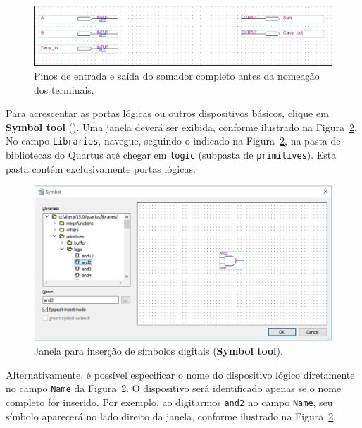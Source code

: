 \documentclass[12pt,a4paper]{article}
\begin{document}
\begin{figure}[htbp!]
    \centering
    \includegraphics[width=\textwidth]{./figs/pin_names_named.png}
    \caption{Pinos de entrada e saída do somador completo antes da nomeação dos terminais.}
    \label{fig:pin_names_named}
\end{figure}

Para acrescentar as portas lógicas ou outros dispositivos básicos, clique em \textbf{Symbol tool} (). Uma janela deverá ser exibida, conforme ilustrado na Figura~\ref{fig:symbol}. No campo \texttt{Libraries}, navegue, seguindo o indicado na Figura~\ref{fig:symbol}, na pasta de bibliotecas do Quartus até chegar em \texttt{logic} (subpasta de \texttt{primitives}). Esta pasta contém exclusivamente portas lógicas. 

\begin{figure}[htbp!]
    \centering
    \includegraphics[width=\textwidth]{./figs/symbol.png}
    \caption{Janela para inserção de símbolos digitais (\textbf{Symbol tool}).}
    \label{fig:symbol}
\end{figure}

Alternativamente, é possível especificar o nome do dispositivo lógico diretamente no campo \texttt{Name} da Figura~\ref{fig:symbol}. O dispositivo será identificado apenas se o nome completo for inserido. Por exemplo, ao digitarmos \texttt{and2} no campo \texttt{Name}, seu símbolo aparecerá no lado direito da janela, conforme ilustrado na Figura~\ref{fig:symbol}.
\end{document}
